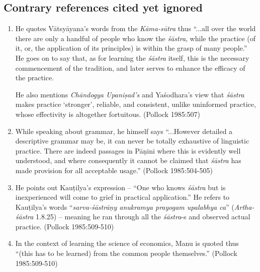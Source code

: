 \subsection*{Contrary references cited yet ignored}

\begin{enumerate}
\item He quotes Vātsyāyana's words from the {\it Kāma-sūtra} thus ``...all over the world there are only a handful of people who know the {\it śāstra}, while the practice (of it, or, the application of its principles) is within the grasp of many people.'' He goes on to say that, as for learning the {\it śāstra} itself, this is the necessary commencement of the tradition, and later serves to enhance the efficacy of the practice. 

He also mentions \textsl{Chāndogya Upaniṣad's} and Yaśodhara's view that {\it śāstra} makes practice `stronger', reliable, and consistent, unlike uninformed practice, whose effectivity is altogether fortuitous. (Pollock 1985:507)

\item While speaking about grammar, he himself says ``...However detailed a descriptive grammar may be, it can never be totally exhaustive of linguistic practice. There are indeed passages in Pāṇini where this is evidently well understood, and where consequently it cannot be claimed that {\it śāstra} has made provision for all acceptable usage.'' (Pollock 1985:504-505)

\item He points out Kauṭilya's expression -- ``One who knows {\it śāstra} but is inexperienced will come to grief in practical application.'' He refers to Kauṭilya's words ``\textsl{sarva-śāstrāṇy anukramya prayogam upalabhya ca}'' (\textsl{Artha-śāstra} 1.8.25) -- meaning he ran through all the {\it śāstra}-s and observed actual practice. (Pollock 1985:509-510)

\item In the context of learning the science of economics, Manu is quoted thus ``(this has to be learned) from the common people themselves.'' (Pollock 1985:509-510)


\end{enumerate}
